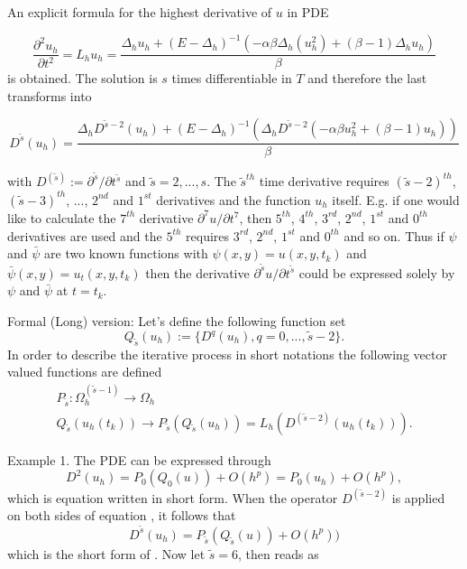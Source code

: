 \documentclass[11pt,a4paper,twoside]{article}
\begin{document}
An explicit formula for the highest derivative of $u$ in PDE  

\begin{equation}\label{Leq}
\frac{ \partial^2 u_h }{ \partial t^2 } = L_h u_h = \frac{ \Delta_h u_h + (E - \Delta_h)^{-1} ( -\alpha \beta \Delta_h( u_h^2) + (\beta -1)\Delta_h u_h) }{\beta}
\end{equation}
is obtained. The solution is $s$ times differentiable in $T$ and therefore the last transforms into

\begin{equation}\label{DLeq}
D^{\tilde s} (u_h) =\frac{ \Delta_h D^{\tilde s - 2}(u_h) + (E - \Delta_h)^{-1}( \Delta_h D^{\tilde s - 2} ( -\alpha \beta u_h^2  + (\beta -1)u_h) )  }{\beta} 
\end{equation}

with $D^{(\tilde s)} := \partial^{\tilde s} / \partial t^{\tilde s}$ and $\tilde s = 2,...,s$. The $\tilde s^{th}$ time derivative requires $(\tilde s-2)^{th}$, $(\tilde s-3)^{th}$, ..., $2^{nd}$ and $1^{st}$ derivatives and the function $u_h$ itself. E.g. if one would like to calculate the $7^{th}$ derivative $\partial^7 u / \partial t^7$, then $5^{th}$, $4^{th}$, $3^{rd}$, $2^{nd}$, $1^{st}$ and $0^{th}$ derivatives are used and the $5^{th}$ requires  $3^{rd}$, $2^{nd}$, $1^{st}$ and $0^{th}$ and so on.  Thus if $\psi$ and $\bar \psi$ are two known functions with $\psi(x,y) = u(x,y, t_k)$ and $\bar \psi(x,y) = u_t(x,y, t_k)$ then the derivative $\partial^{\tilde s} u / \partial t^{\tilde s}$ could be expressed solely by $\psi$ and $\bar \psi$ at $t = t_k$.

\iffalse
Formal (Long) version:
Let's define the following function set
\begin{equation}
Q_{\tilde s}(u_h) := \{ D^{q}(u_h), q = 0, ... , \tilde s - 2 \}.
\end{equation}
In order to describe the iterative process in short notations the following vector valued functions are defined
\begin{align*} 
P_{\tilde s} : \Omega_h^{(\tilde s - 1)} \rightarrow \Omega_h
\\ Q_{\tilde s}(u_h(t_k)) \rightarrow P_{\tilde s} (Q_{\tilde s}(u_h) ) = L_h( D^{(\tilde s - 2)} (u_h(t_k)) ).
\end{align*}

Example 1. The PDE  can be expressed through 
\begin{equation}\label{example}
D^{2}(u_h) = P_0(Q_0(u)) + O(h^p) = P_0(u_h) + O(h^p),
\end{equation}
which is equation  written in short form. When the operator $D^{(\tilde s -2)}$ is applied on both sides of equation , it follows that
\begin{equation}\label{DPeq}
D^{\tilde s}(u_h) = P_{\tilde s}(Q_{\tilde s}(u)) + O(h^p))
\end{equation}
which is the short form of . Now let $\tilde s = 6$, then  reads as
\end{document}
